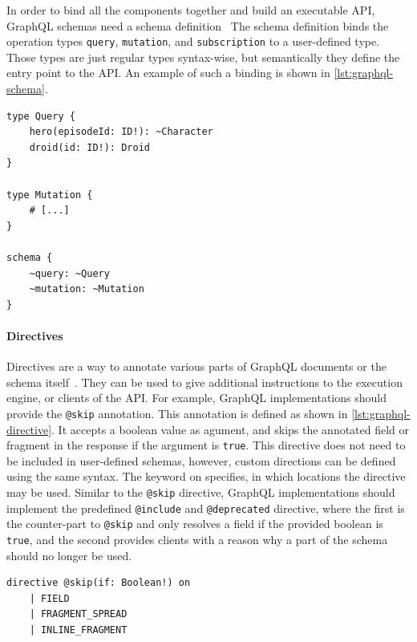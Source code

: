 In order to bind all the components together and build an executable \ac{API}, GraphQL schemas need a schema definition~\cite{Facebook2018}
The schema definition binds the operation types \texttt{query}, \texttt{mutation}, and \texttt{subscription} to a user-defined type.
Those types are just regular types syntax-wise, but semantically they define the entry point to the \ac{API}.
An example of such a binding is shown in \autoref{lst:graphql-schema}.

\begin{lstlisting}[caption={Query and Mutation Types}, language=graphqls, label={lst:graphql-schema}]
type Query {
    hero(episodeId: ID!): ~Character
    droid(id: ID!): Droid
}

type Mutation { 
    # [...]
}

schema {
    ~query: ~Query
    ~mutation: ~Mutation
}      
\end{lstlisting}

\paragraph{Directives}

Directives are a way to annotate various parts of GraphQL documents or the schema itself~\cite{Facebook2018}.
They can be used to give additional instructions to the execution engine, or clients of the \ac{API}.
For example, GraphQL implementations should provide the \texttt{@skip} annotation.
This annotation is defined as shown in \autoref{lst:graphql-directive}.
It accepts a boolean value as agument, and skips the annotated field or fragment in the response if the argument is \texttt{true}.
This directive does not need to be included in user-defined schemas, however, custom directions can be defined using the same syntax.
The keyword on specifies, in which locations the directive may be used.
Similar to the \texttt{@skip} directive, GraphQL implementations should implement the predefined \texttt{@include} and \texttt{@deprecated} directive, where the first is the counter-part to \texttt{@skip} and only resolves a field if the provided boolean is \texttt{true}, and the second provides clients with a reason why a part of the schema should no longer be used.


\begin{lstlisting}[caption={Definition of the \texttt{@skip} Annotation}, language=graphqls, label={lst:graphql-directive}]
directive @skip(if: Boolean!) on
    | FIELD 
    | FRAGMENT_SPREAD 
    | INLINE_FRAGMENT
\end{lstlisting}

